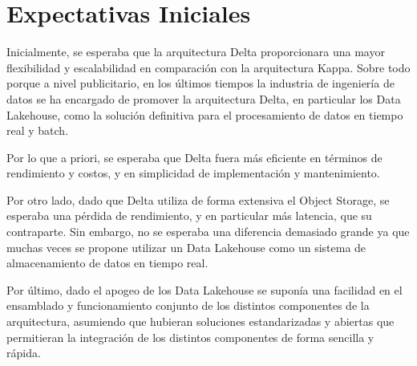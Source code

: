 \section{Expectativas Iniciales}

Inicialmente, se esperaba que la arquitectura Delta proporcionara una mayor flexibilidad y escalabilidad en comparación con la arquitectura Kappa.
Sobre todo porque a nivel publicitario, en los últimos tiempos la industria de ingeniería de datos se ha encargado de promover la arquitectura Delta, 
en particular los Data Lakehouse, como la solución definitiva para el procesamiento de datos en tiempo real y batch.

Por lo que a priori, se esperaba que Delta fuera más eficiente en términos de rendimiento y costos, y en simplicidad de implementación y mantenimiento.

Por otro lado, dado que Delta utiliza de forma extensiva el Object Storage, se esperaba una pérdida de rendimiento, y en particular más latencia, que su contraparte. 
Sin embargo, no se esperaba una diferencia demasiado grande ya que muchas veces se propone utilizar un Data Lakehouse como un sistema de almacenamiento de datos en tiempo real.

Por último, dado el apogeo de los Data Lakehouse se suponía una facilidad en el ensamblado y funcionamiento conjunto de los distintos componentes de la arquitectura,
asumiendo que hubieran soluciones estandarizadas y abiertas que permitieran la integración de los distintos componentes de forma sencilla y rápida. 

\newpage